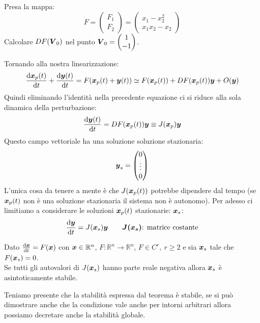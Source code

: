 \begin{ex}[Calcolo di DF]
    Presa la mappa:
    \[
        F = \begin{pmatrix} F_1 \\ F_2 \end{pmatrix} = 
	\begin{pmatrix} x_1 -x_2^2 \\ x_1x_2-x_2 \end{pmatrix} 
    \] 
    Calcolare $DF(\boldsymbol{V}_0)$ nel punto $\boldsymbol{V}_0=\begin{pmatrix} 1\\ -1 \end{pmatrix} $.
\end{ex}
\noindent
\noindent
Tornando alla nostra linearizzazione:
\[
    \frac{\text{d} \boldsymbol{x}_p(t)}{\text{d} t} + \frac{\text{d} \boldsymbol{y} (t)}{\text{d} t} = 
    F(\boldsymbol{x}_p(t)+ \boldsymbol{y} (t)) \simeq 
    F(\boldsymbol{x}_p(t))+DF(\boldsymbol{x}_p(t))\boldsymbol{y}  + O(\boldsymbol{y})
\] 
Quindi eliminando l'identità nella precedente equazione ci si riduce alla sola dinamica della perturbazione:
\[
    \frac{\text{d} \boldsymbol{y} (t)}{\text{d} t} = DF(\boldsymbol{x}_p(t))\boldsymbol{y}\equiv
    J(\boldsymbol{x}_p)\boldsymbol{y}
\] 
Questo campo vettoriale ha una soluzione soluzione stazionaria: 
\[
\boldsymbol{y}_s = \begin{pmatrix} 0 \\ \vdots \\ 0 \end{pmatrix}
\] 
L'unica cosa da tenere a mente è che $J(\boldsymbol{x}_p(t))$  potrebbe dipendere dal tempo (se $\boldsymbol{x}_p(t)$ non è una soluzione stazionaria il sistema non è autonomo). Per adesso ci limitiamo a considerare le soluzioni $\boldsymbol{x}_p(t)$  stazionarie: $\boldsymbol{x}_s$:
\[
    \frac{\text{d} \boldsymbol{y}}{\text{d} t} = J(\boldsymbol{x}_s)\boldsymbol{y}  \qquad \boldsymbol{J(\boldsymbol{x}_s)}  \text{: matrice costante}
\] 
\begin{thm}
    Dato $\frac{\text{d} \boldsymbol{x}}{\text{d} t} = F(\boldsymbol{x})$ con $\boldsymbol{x}\in\mathbb{R}^n$, $F:\mathbb{R}^n \to \mathbb{R}^n$, $F \in C^r, \ r\ge 2$ e sia $\boldsymbol{x}_s$ tale che $F(\boldsymbol{x}_s)=0$.\\
    Se tutti gli autovalori di $J(\boldsymbol{x}_s)$ hanno parte reale negativa allora $\boldsymbol{x}_s$ è asintoticamente stabile.
\end{thm}
\noindent
Teniamo presente che la stabilità espressa dal teorema è stabile, se si può dimostrare anche che la condizione vale anche per intorni arbitrari allora possiamo decretare anche la stabilità globale.\\
